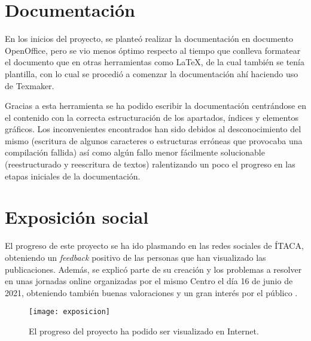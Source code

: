 \section{Documentación}

En los inicios del proyecto, se planteó realizar la documentación en documento OpenOffice, pero se vio menos óptimo respecto al tiempo que conlleva formatear el documento que en otras herramientas como LaTeX, de la cual también se tenía plantilla, con lo cual se procedió a comenzar la documentación ahí haciendo uso de Texmaker.

Gracias a esta herramienta se ha podido escribir la documentación centrándose en el contenido con la correcta estructuración de los apartados, índices y elementos gráficos. Los inconvenientes encontrados han sido debidos al desconocimiento del mismo (escritura de algunos caracteres o estructuras erróneas que provocaba una compilación fallida) así como algún fallo menor fácilmente solucionable (reestructurado y reescritura de textos) ralentizando un poco el progreso en las etapas iniciales de la documentación.

\section{Exposición social}

El progreso de este proyecto se ha ido plasmando en las redes sociales de ÍTACA, obteniendo un \textit{feedback} positivo de las personas que han visualizado las publicaciones. Además, se explicó parte de su creación y los problemas a resolver en unas jornadas online organizadas por el mismo Centro el día 16 de junio de 2021, obteniendo también buenas valoraciones y un gran interés por el público \cite{itaca:jornadas}.

\begin{figure}[h]
	\centering
	\texttt{[image: exposicion]}
	\caption{El progreso del proyecto ha podido ser visualizado en Internet.}
	\label{fig:exposicion}
\end{figure}